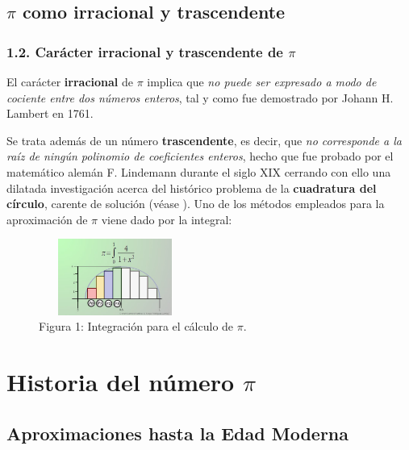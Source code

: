 \documentclass{beamer}
\begin{document}
\subsection{$\pi$ como irracional y trascendente}
\begin{frame}
\frametitle{1.2. Carácter irracional y trascendente de $\pi$}

El carácter \textbf{irracional} de $\pi$ implica que \emph{no puede ser expresado a 
modo de cociente entre dos números enteros}, tal y como fue demostrado por Johann H. 
Lambert en 1761. \par \pause
Se trata además de un número \textbf{trascendente}, es decir, que \emph{no corresponde 
a la raíz de ningún polinomio de coeficientes enteros}, hecho que fue probado por el 
matemático alemán F. Lindemann durante el siglo XIX cerrando con ello una dilatada 
investigación acerca del histórico problema de la \textbf{cuadratura del círculo}, 
carente de solución (véase \cite{hist_pi}). Uno de los métodos empleados para la 
aproximación de $\pi$ viene dado por la integral: \pause

\begin{figure}[!th]
\begin{center}\includegraphics[height=2.5cm, width=5cm]{img/aprox.eps}
\caption{Figura 1: Integración para el cálculo de $\pi$.}
\label{int}
\end{center}
\end{figure}

\end{frame}


\section{Historia del número $\pi$}
\subsection{Aproximaciones hasta la Edad Moderna}

\end{document}
